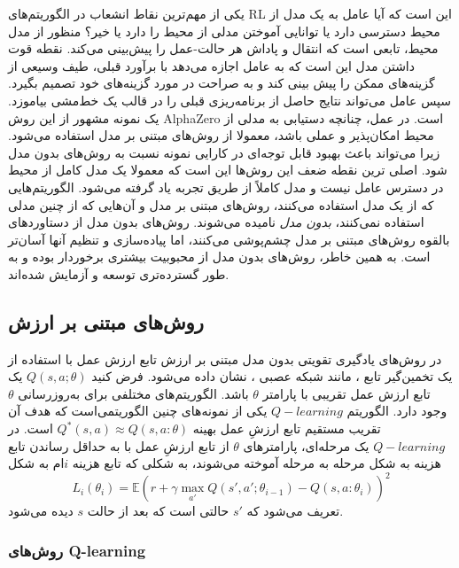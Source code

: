 
یکی از مهم‌ترین نقاط انشعاب در الگوریتم‌‌های RL این است که آیا عامل به یک مدل از محیط دسترسی دارد یا  توانایی آموختن مدلی از محیط را دارد یا خیر؟ منظور از مدل محیط، تابعی است که انتقال و پاداش هر حالت-عمل را پیش‌بینی می‌کند.
نقطه قوت داشتن مدل این است که به عامل اجازه می‌دهد با برآورد قبلی، طیف وسیعی از گزینه‌های ممکن را پیش بینی کند و به صراحت در مورد گزینه‌های خود تصمیم بگیرد. سپس عامل می‌تواند نتایج حاصل از برنامه‌ریزی قبلی را در قالب یک خط‌مشی بیاموزد. یک نمونه مشهور از این روش 
AlphaZero است. در عمل، چنانچه دستیابی به مدلی از محیط امکان‌پذیر و عملی باشد، معمولا از روش‌های مبتنی بر مدل استفاده می‌شود. زیرا می‌تواند باعث بهبود قابل توجه‌ای در کارایی نمونه نسبت به روش‌های بدون مدل شود. اصلی ترین نقطه ضعف این روش‌ها این است که معمولا یک مدل کامل از محیط  در دسترس عامل نیست و مدل کاملاً از طریق تجربه یاد گرفته می‌شود. الگوریتم‌هایی که از یک مدل استفاده می‌کنند، روش‌های مبتنی بر مدل و آن‌هایی که از چنین مدلی استفاده نمی‌کنند، \textit{بدون مدل} نامیده می‌شوند. روش‌های بدون مدل از دستاوردهای بالقوه روش‌های مبتنی بر مدل چشم‌پوشی می‌کنند‌، اما پیاده‌سازی و تنظیم آنها آسان‌تر است. به همین خاطر، روش‌های بدون مدل از محبوبیت بیشتری برخوردار بوده و به طور گسترده‌تری توسعه و آزمایش شده‌اند.

\subsection{روش‌های مبتنی بر ارزش}


در روش‌های یادگیری تقویتی بدون مدل مبتنی بر ارزش
تابع ارزش عمل با استفاده از  یک تخمین‌گیر تابع
 ، مانند شبکه عصبی ، نشان داده می‌شود. فرض کنید
$Q(s,a;\theta)$
یک تابع ارزش عمل تقریبی با پارامتر  
$\theta$ 
باشد.
الگوریتم‌های مختلفی برای به‌روزرسانی $\theta$ وجود دارد.
الگوریتم $ Q-learning$ یکی از نمونه‌های چنین الگوریتمی‌است
که هدف آن تقریب مستقیم تابع ارزشِ عمل بهینه 
$Q^*(s,a) \approx Q(s,a: \theta)$
 است. در $ Q-learning$ یک مرحله‌ای، پارامترهای $\theta$ از تابع ارزشِ عمل با به حداقل رساندن تابع هزینه به شکل مرحله به مرحله آموخته می‌شوند، به شکلی که تابع هزینه $i$ام به شکل 
$$L_i(\theta_i) = \mathbb{E} {\left( r+\gamma \max_{a'} Q(s',a'; \theta_{i-1})- Q(s,a:\theta_i) \right)}^2$$
 تعریف می‌شود که 
 $s'$
 حالتی است که بعد از حالت $s$ دیده می‌شود.
 \subsubsection{روش‌های Q-learning}

